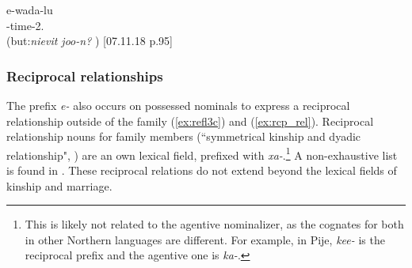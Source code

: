 \ea \label{ex:same_age}
\gll e-wada-lu\\ 
 -time-2.\\ 
\glt {} (but:\textit{nievit joo-n?}  ) {[07.11.18 p.95]}\
\z

\subsubsection{Reciprocal relationships}
\label{ssec:rcp_relationship}


The prefix \textit{e-} also occurs on possessed nominals to express a reciprocal relationship outside of the family (\ref{ex:refl3c}) and (\ref{ex:rcp_rel}). Reciprocal relationship nouns for family members (``symmetrical kinship and dyadic relationship", \citealt[48]{bril_semantic_2005b}) are an own lexical field, prefixed with \textit{xa-}.\footnote{This is likely not related to the agentive nominalizer, as the cognates for both in other Northern languages are different. For example, in Pije, \textit{kee-} is the reciprocal prefix and the agentive one is \textit{ka-}.} A non-exhaustive list is found in . These reciprocal relations do not extend beyond the lexical fields of kinship and marriage.

